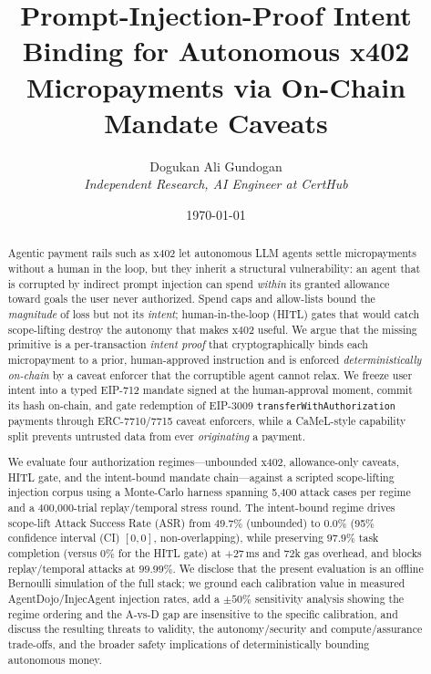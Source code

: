 \documentclass[10pt,twocolumn,letterpaper]{article}
\begin{document}
\title{Prompt-Injection-Proof Intent Binding for Autonomous x402 Micropayments via On-Chain Mandate Caveats}
\author{Dogukan Ali Gundogan \\ \textit{Independent Research, AI Engineer at CertHub}}
\date{\today}
\maketitle

\begin{abstract}
Agentic payment rails such as x402 let autonomous LLM agents settle micropayments without a human in the loop, but they inherit a structural vulnerability: an agent that is corrupted by indirect prompt injection can spend \emph{within} its granted allowance toward goals the user never authorized. Spend caps and allow-lists bound the \emph{magnitude} of loss but not its \emph{intent}; human-in-the-loop (HITL) gates that would catch scope-lifting destroy the autonomy that makes x402 useful. We argue that the missing primitive is a per-transaction \emph{intent proof} that cryptographically binds each micropayment to a prior, human-approved instruction and is enforced \emph{deterministically on-chain} by a caveat enforcer that the corruptible agent cannot relax. We freeze user intent into a typed EIP-712 mandate signed at the human-approval moment, commit its hash on-chain, and gate redemption of EIP-3009 \texttt{transferWithAuthorization} payments through ERC-7710/7715 caveat enforcers, while a CaMeL-style capability split prevents untrusted data from ever \emph{originating} a payment.

We evaluate four authorization regimes---unbounded x402, allowance-only caveats, HITL gate, and the intent-bound mandate chain---against a scripted scope-lifting injection corpus using a Monte-Carlo harness spanning 5{,}400 attack cases per regime and a 400{,}000-trial replay/temporal stress round. The intent-bound regime drives scope-lift Attack Success Rate (ASR) from $49.7\%$ (unbounded) to $0.0\%$ (95\% confidence interval (CI) $[0,0]$, non-overlapping), while preserving $97.9\%$ task completion (versus $0\%$ for the HITL gate) at $+27$\,ms and $72$k gas overhead, and blocks replay/temporal attacks at $99.99\%$. We disclose that the present evaluation is an offline Bernoulli simulation of the full stack; we ground each calibration value in measured AgentDojo/InjecAgent injection rates, add a $\pm50\%$ sensitivity analysis showing the regime ordering and the A-vs-D gap are insensitive to the specific calibration, and discuss the resulting threats to validity, the autonomy/security and compute/assurance trade-offs, and the broader safety implications of deterministically bounding autonomous money.
\end{abstract}
\end{document}
